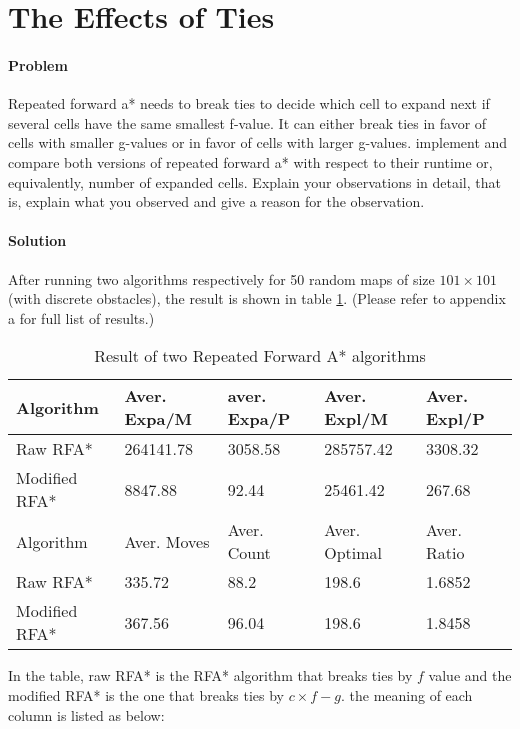 \section{The Effects of Ties}

\paragraph{Problem} 
Repeated forward a* needs to break ties to decide which cell to expand next if
several cells have the same smallest f-value. It can either break ties in favor
of cells with smaller g-values or in favor of cells with larger g-values.
implement and compare both versions of repeated forward a* with respect to
their runtime or, equivalently, number of expanded cells. Explain your
observations in detail, that is, explain what you observed and give a reason
for the observation.

\paragraph{Solution} 
After running two algorithms respectively for 50 random maps of size $101\times
101$ (with discrete obstacles), the result is shown in table \ref{tbl:two-rpa}.
(Please refer to appendix a for full list of results.)

\begin{table}[h!]
\centering
\caption{Result of two Repeated Forward A* algorithms}
\begin{tabular}{|l|l|l|l|l|}
\hline
Algorithm & Aver. Expa/M & aver. Expa/P & Aver. Expl/M & Aver. Expl/P \\
\hline
Raw RFA* & 264141.78 & 3058.58 & 285757.42 & 3308.32 \\
\hline
Modified RFA* & 8847.88 & 92.44 & 25461.42 & 267.68 \\
\hhline{|=|=|=|=|=|}
Algorithm & Aver. Moves & Aver. Count & Aver. Optimal & Aver. Ratio \\
\hline
Raw RFA* & 335.72 & 88.2 & 198.6 & 1.6852 \\
\hline
Modified RFA* & 367.56 & 96.04 & 198.6 & 1.8458 \\
\hline
\end{tabular}
\label{tbl:two-rpa}
\end{table}

In the table, raw RFA* is the RFA* algorithm that breaks ties by $f$ value and
the modified RFA* is the one that breaks ties by $c\times f-g$. the meaning of
each column is listed as below:

